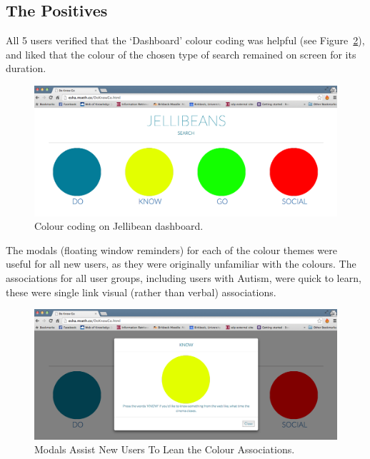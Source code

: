 \documentclass[a4paper, 11pt]{article}
\begin{document}
\subsection{The Positives}
All 5 users verified that the `Dashboard' colour coding was helpful (see Figure~\ref{colourCoding}), and liked that the colour of the chosen type of search remained on screen for its duration.

\begin{figure}[H]
\begin{center}
\includegraphics[scale=0.25]{DoKnowGoSocialDashboard}
\caption{Colour coding on Jellibean dashboard.}
\label{colourCoding}
\end{center}
\end{figure}

The modals (floating window reminders) for each of the colour themes were useful for all new users, as they were originally unfamiliar with the colours. The associations for all user groups, including users with Autism, were quick to learn, these were single link visual (rather than verbal) associations.\\

\begin{figure}[H]
\begin{center}
\includegraphics[scale=0.25]{floatingModals}
\caption{Modals Assist New Users To Lean the Colour Associations.}
\label{colourCoding}
\end{center}
\end{figure}
\end{document}
